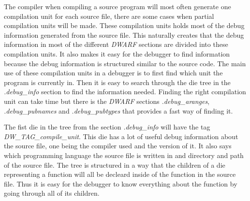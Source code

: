  


The compiler when compiling a source program will most often generate one compilation unit for each source file, there are some cases when partial compilation units will be made.
These compilation units holds most of the debug information generated from the source file.
This naturally creates that the debug information in most  of the different \emph{DWARF} sections are divided into these compilation units.
It also makes it easy for the debugger to find information because the debug information is structured similar to the source code.
The main use of these compilation units in a debugger is to first find which unit the program is currently in.
Then it is easy to search through the \gls{die} tree in the \emph{.debug\_info} section to find the information needed. 
Finding the right compilation unit can take time but there is the \emph{DWARF} sections \emph{.debug\_aranges}, \emph{.debug\_pubnames} and \emph{.debug\_pubtypes} that provides a fast way of finding it.

The fist \gls{die} in the tree from the section \emph{.debug\_info} will have the tag \emph{DW\_TAG\_compile\_unit}.
This \gls{die} has a lot of useful debug information about the source file, one being the compiler used and the version of it.
It also says which programming language the source file is written in and directory and path of the source file.
The tree is structured in a way that the children of a \gls{die} representing a function will all be decleard inside of the function in the source file.
Thus it is easy for the debugger to know everything about the function by going through all of its children.

